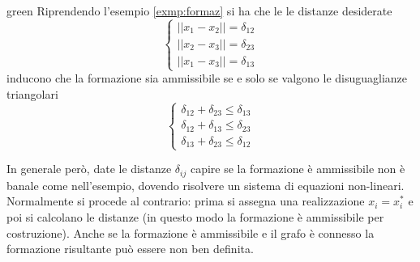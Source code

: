 \begin{itemize}
\begin{center}
\begin{tikzpicture}[scale=0.7]
\end{tikzpicture}
\end{center}
\begin{mybox}[breakable]{green}{}
Riprendendo l'esempio \ref{exmp:formaz} si ha che le le distanze desiderate
\[
\begin{cases}
||x_1 - x_2|| = \delta_{12} \\
||x_2 - x_3|| = \delta_{23} \\
||x_1 - x_3|| = \delta_{13}   
\end{cases}
\] inducono che la formazione sia ammissibile se e solo se valgono le disuguaglianze triangolari
\[
\begin{cases}
\delta_{12} + \delta_{23} \leq \delta_{13} \\
\delta_{12} + \delta_{13} \leq \delta_{23} \\
\delta_{13} + \delta_{23} \leq \delta_{12}
\end{cases}
\]
\end{mybox}
\end{itemize}
In generale per\`o, date le distanze $\delta_{ij}$ capire se la formazione \`e ammissibile non \`e banale come nell'esempio, dovendo risolvere un sistema di equazioni non-lineari. Normalmente si procede al contrario: prima si assegna una realizzazione $x_i = x_i^*$ e poi si calcolano le distanze (in questo modo la formazione \`e ammissibile per costruzione).
Anche se la formazione \`e ammissibile e il grafo \`e connesso la formazione risultante pu\`o essere non ben definita.


